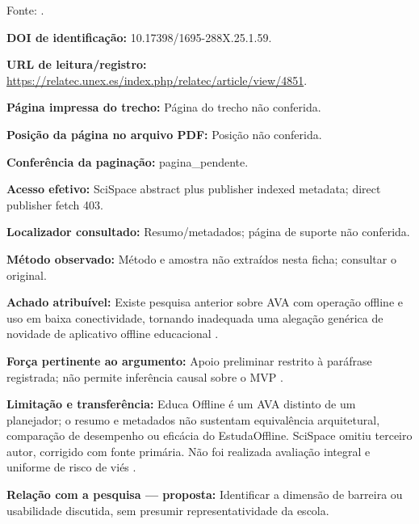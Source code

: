 Fonte: \citet{linhalis2026}.

\noindent\textbf{DOI de identificação:} 10.17398/1695-288X.25.1.59.\par\medskip

\noindent\textbf{URL de leitura/registro:} \url{https://relatec.unex.es/index.php/relatec/article/view/4851}.\par\medskip

\noindent\textbf{Página impressa do trecho:} Página do trecho não conferida.\par\medskip

\noindent\textbf{Posição da página no arquivo PDF:} Posição não conferida.\par\medskip

\noindent\textbf{Conferência da paginação:} pagina\_pendente.\par\medskip

\noindent\textbf{Acesso efetivo:} SciSpace abstract plus publisher indexed metadata; direct publisher fetch 403.\par\medskip

\noindent\textbf{Localizador consultado:} Resumo/metadados; página de suporte não conferida.\par\medskip

\noindent\textbf{Método observado:} Método e amostra não extraídos nesta ficha; consultar o original.\par\medskip

\noindent\textbf{Achado atribuível:} Existe pesquisa anterior sobre AVA com operação offline e uso em baixa conectividade, tornando inadequada uma alegação genérica de novidade de aplicativo offline educacional \citep{linhalis2026}.\par\medskip

\noindent\textbf{Força pertinente ao argumento:} Apoio preliminar restrito à paráfrase registrada; não permite inferência causal sobre o MVP \citep{linhalis2026}.\par\medskip

\noindent\textbf{Limitação e transferência:} Educa Offline é um AVA distinto de um planejador; o resumo e metadados não sustentam equivalência arquitetural, comparação de desempenho ou eficácia do EstudaOffline. SciSpace omitiu terceiro autor, corrigido com fonte primária. Não foi realizada avaliação integral e uniforme de risco de viés \citep{linhalis2026}.\par\medskip

\noindent\textbf{Relação com a pesquisa — proposta:} Identificar a dimensão de barreira ou usabilidade discutida, sem presumir representatividade da escola.\par\medskip


